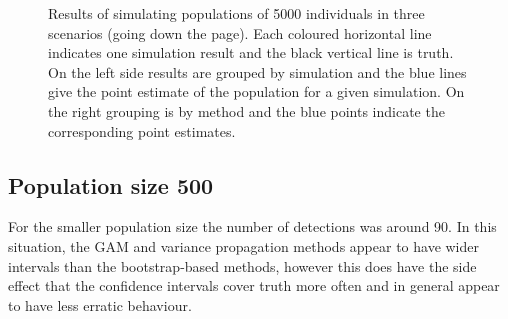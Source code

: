 \documentclass[11pt]{amsart}
\begin{document}
\begin{figure}
\begin{center}
\setlength{\tabcolsep}{0mm}
%
%
\caption{Results of simulating populations of 5000 individuals in three scenarios (going down the page). Each coloured horizontal line indicates one simulation result and the black vertical line is truth. On the left side results are grouped by simulation and the blue lines give the point estimate of the population for a given simulation. On the right grouping is by method and the blue points indicate the corresponding point estimates.}
\label{res-5000}
\end{center}
\end{figure}



\subsection{Population size 500}

For the smaller population size the number of detections was around 90. In this situation, the GAM and variance propagation methods appear to have wider intervals than the bootstrap-based methods, however this does have the side effect that the confidence intervals cover truth more often and in general appear to have less erratic behaviour.
\end{document}
